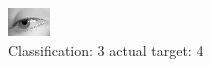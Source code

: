 \begin{figure}[h!]
\begin{center}
\includegraphics[width=0.60\columnwidth]{figures/ID2957_class_3_target_4.png}
\end{center}
\caption{ Classification: 3 actual target: 4}
\label{fig:ID2957_class_3_target_4}
\end{figure}
